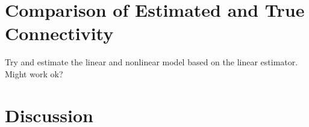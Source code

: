 \documentclass[onecolumn,draftcls]{IEEEtran}
\begin{document}
\section{Comparison of Estimated and True Connectivity}
Try and estimate the linear and nonlinear model based on the linear estimator. Might work ok?

\section{Discussion}

%
%

%
%
%
\end{document}
